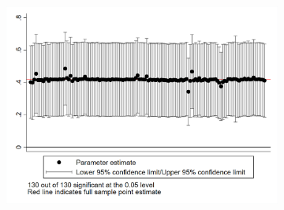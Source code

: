 \documentclass{article}
\begin{document}
\begin{figure}[htbp]
\begin{subfigure}{0.3\textwidth}
    \end{subfigure}
    \begin{subfigure}{0.3\textwidth}
        \includegraphics[width=\linewidth]{exhibits_old/figures/exogeneity_tests/loo_iv_schdist_ind.png}
        \label{fig:sub3}
    \end{subfigure}


\end{figure}
\end{document}
